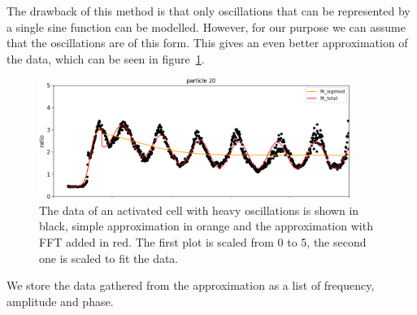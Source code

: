The drawback of this method is that only oscillations that can be represented by a single sine function can be modelled. However, for our purpose we can assume that the oscillations are of this form.
This gives an even better approximation of the data, which can be seen in figure~\ref{fig:particle_vis_fft_approx}.

\begin{figure}[h]
	\centering
	\includegraphics[width=0.9\textwidth]{fig/particle_vis_fft_approx_pos}
	
	\caption{The data of an activated cell with heavy oscillations is shown in black, simple approximation in orange and the approximation with FFT added in red. The first plot is scaled from 0 to 5, the second one is scaled to fit the data.}
	\label{fig:particle_vis_fft_approx}
\end{figure}

We store the data gathered from the approximation as a list of frequency, amplitude and phase.
